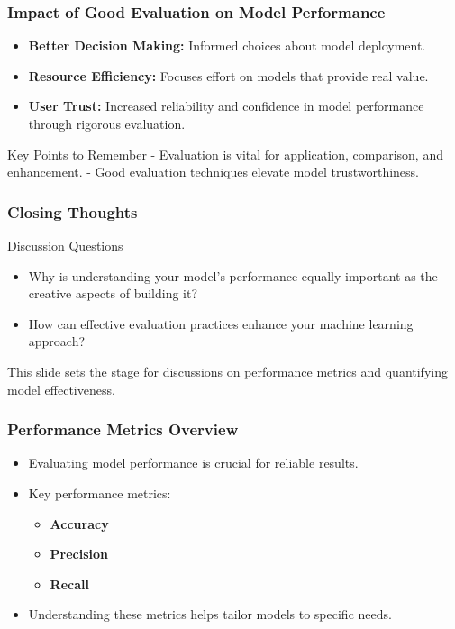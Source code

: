 \documentclass[aspectratio=169]{beamer}
\begin{document}
\begin{frame}[fragile]
    \frametitle{Impact of Good Evaluation on Model Performance}
    \begin{itemize}
        \item \textbf{Better Decision Making:} Informed choices about model deployment.
        \item \textbf{Resource Efficiency:} Focuses effort on models that provide real value.
        \item \textbf{User Trust:} Increased reliability and confidence in model performance through rigorous evaluation.
    \end{itemize}
    
    \begin{block}{Key Points to Remember}
        - Evaluation is vital for application, comparison, and enhancement.
        - Good evaluation techniques elevate model trustworthiness.
    \end{block}
\end{frame}

\begin{frame}[fragile]
    \frametitle{Closing Thoughts}
    \begin{block}{Discussion Questions}
        \begin{itemize}
            \item Why is understanding your model's performance equally important as the creative aspects of building it?
            \item How can effective evaluation practices enhance your machine learning approach?
        \end{itemize}
    \end{block}
    This slide sets the stage for discussions on performance metrics and quantifying model effectiveness.
\end{frame}

\begin{frame}[fragile]
    \frametitle{Performance Metrics Overview}
    \begin{itemize}
        \item Evaluating model performance is crucial for reliable results.
        \item Key performance metrics:
        \begin{itemize}
            \item \textbf{Accuracy}
            \item \textbf{Precision}
            \item \textbf{Recall}
        \end{itemize}
        \item Understanding these metrics helps tailor models to specific needs.
    \end{itemize}
\end{frame}
\end{document}
